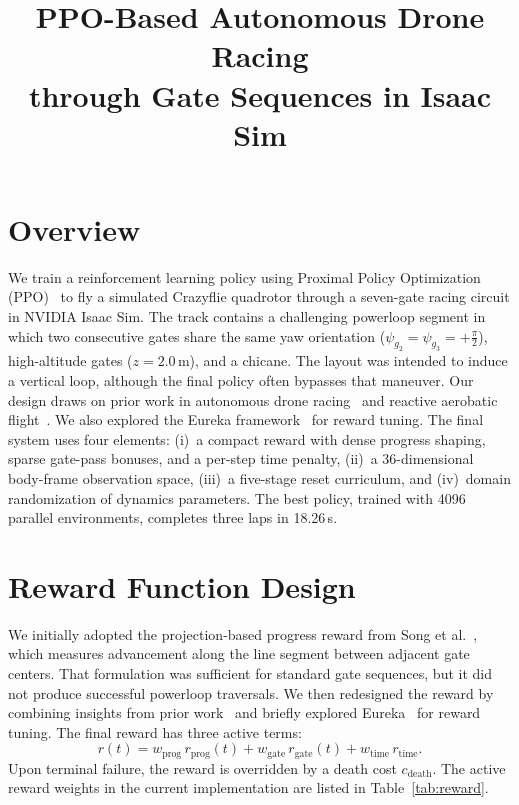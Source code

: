 \documentclass[conference]{IEEEtran}
\title{PPO-Based Autonomous Drone Racing\\through Gate Sequences in Isaac Sim}
\author{
\IEEEauthorblockN{Jinyuan Zhang, Ningze Zhong}
\IEEEauthorblockA{\{jinyuanz, zhong666\}@seas.upenn.edu}
}
\begin{document}
\maketitle

\section{Overview}

We train a reinforcement learning policy using Proximal Policy Optimization (PPO)~\cite{schulman2017ppo} to fly a simulated Crazyflie quadrotor through a seven-gate racing circuit in NVIDIA Isaac Sim. The track contains a challenging powerloop segment in which two consecutive gates share the same yaw orientation ($\psi_{g_2}=\psi_{g_3}=+\frac{\pi}{2}$), high-altitude gates ($z=2.0$\,m), and a chicane. The layout was intended to induce a vertical loop, although the final policy often bypasses that maneuver. Our design draws on prior work in autonomous drone racing~\cite{song2021autonomous, kaufmann2023champion, song2023reaching} and reactive aerobatic flight~\cite{han2025reactive}. We also explored the Eureka framework~\cite{ma2024eureka} for reward tuning. The final system uses four elements: (i)~a compact reward with dense progress shaping, sparse gate-pass bonuses, and a per-step time penalty, (ii)~a 36-dimensional body-frame observation space, (iii)~a five-stage reset curriculum, and (iv)~domain randomization of dynamics parameters. The best policy, trained with 4096 parallel environments, completes three laps in 18.26\,s.

\section{Reward Function Design}

We initially adopted the projection-based progress reward from Song et al.~\cite{song2021autonomous}, which measures advancement along the line segment between adjacent gate centers. That formulation was sufficient for standard gate sequences, but it did not produce successful powerloop traversals. We then redesigned the reward by combining insights from prior work~\cite{kaufmann2023champion, song2023reaching, han2025reactive} and briefly explored Eureka~\cite{ma2024eureka} for reward tuning. The final reward has three active terms:
\begin{equation}\label{eq:reward}
  r(t) = w_{\text{prog}}\, r_{\text{prog}}(t) + w_{\text{gate}}\, r_{\text{gate}}(t) + w_{\text{time}}\, r_{\text{time}}.
\end{equation}
Upon terminal failure, the reward is overridden by a death cost $c_{\text{death}}$. The active reward weights in the current implementation are listed in Table~\ref{tab:reward}.
\end{document}
